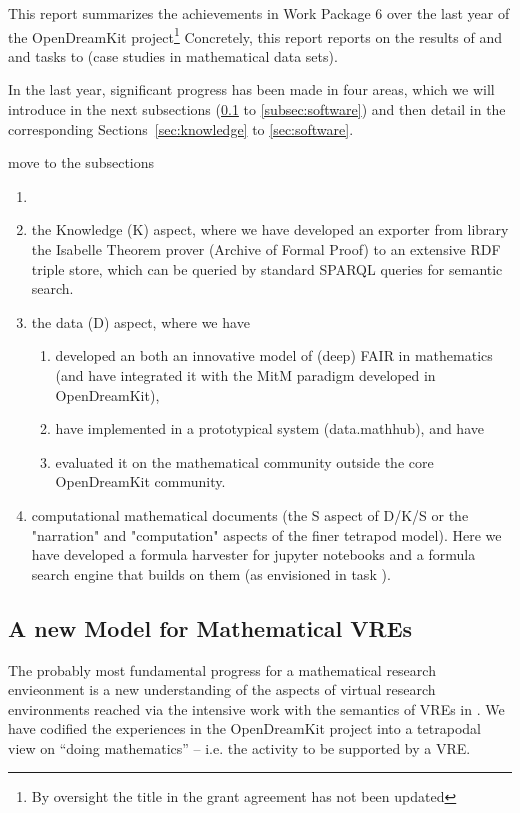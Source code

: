 This report summarizes the achievements in Work Package 6 over the last year of the OpenDreamKit project\footnote{By oversight the title in the grant agreement has not been updated} Concretely, this report reports on the results of  and  and tasks  to  (case studies in mathematical data sets).

In the last year, significant progress has been made in four areas, which we will introduce in the next subsections (\ref{sec:tetrapod} to \ref{subsec:software}) and then detail in the corresponding Sections~\ref{sec:knowledge} to \ref{sec:software}.

\begin{oldpart}{move to the subsections}
\begin{enumerate}
\item \item the Knowledge (K) aspect, where we have developed an exporter from library the Isabelle Theorem prover (Archive of Formal Proof) to an extensive RDF triple store, which can be queried by standard SPARQL queries for semantic search. \item the data (D) aspect, where we have
  \begin{enumerate}
  \item developed an both an innovative model of (deep) FAIR in mathematics (and have integrated it with the MitM paradigm developed in OpenDreamKit),
  \item have implemented in a prototypical system (data.mathhub), and have
  \item evaluated it on the mathematical community outside the core OpenDreamKit community.
  \end{enumerate}
\item computational mathematical documents (the S aspect of D/K/S or the "narration" and "computation" aspects of the finer tetrapod model). Here we have developed a formula harvester for jupyter notebooks and a formula search engine that builds on them (as envisioned in task ).
\end{enumerate}
\end{oldpart}

\subsection{A new Model for Mathematical VREs}\label{sec:tetrapod}
The probably most fundamental progress for a mathematical research envieonment is a new understanding of the aspects of virtual research environments reached via the intensive work with the semantics of VREs in .  We have codified the experiences in the OpenDreamKit project into a tetrapodal view on ``doing
mathematics'' -- i.e. the activity to be supported by a VRE.

